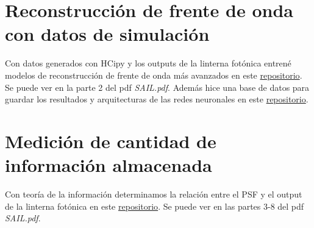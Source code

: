\section{Reconstrucción de frente de onda con datos de simulación}
Con datos generados con HCipy y los outputs de la linterna fotónica entrené modelos de reconstrucción de frente de onda más avanzados en este \href{https://github.com/Dacarpe03/PLImageReconstruction}{repositorio}. Se puede ver en la parte 2 del pdf \textit{SAIL.pdf}. Además hice una base de datos para guardar los resultados y arquitecturas de las redes neuronales en este \href{https://github.com/Dacarpe03/SAILExperimentsDatabase}{repositorio}. 

\section{Medición de cantidad de información almacenada}
Con teoría de la información determinamos la relación entre el PSF y el output de la linterna fotónica en este \href{https://github.com/Dacarpe03/PLImageReconstruction}{repositorio}. Se puede ver en las partes 3-8 del pdf \textit{SAIL.pdf}.